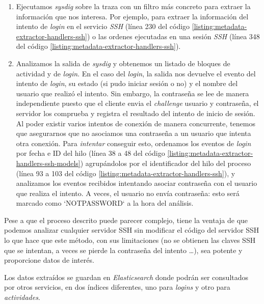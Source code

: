 \begin{enumerate}
    \item Ejecutamos \emph{sysdig} sobre la traza con un filtro más concreto para extraer la información que nos interesa. Por ejemplo, para extraer la información
    del intento de \emph{login} en el servicio \emph{SSH} (línea 230 del código \ref{listing:metadata-extractor-handlers-ssh}) o las ordenes ejecutadas en una sesión \emph{SSH} (línea 348 del código \ref{listing:metadata-extractor-handlers-ssh}).
    \item Analizamos la salida de \emph{sysdig} y obtenemos un listado de bloques de actividad y de \emph{login}. En el caso del \emph{login}, la salida nos devuelve
    el evento del intento de \emph{login}, su estado (si pudo iniciar sesión o no) y el nombre del usuario que realizó el intento. Sin embargo, la contraseña se lee de manera independiente puesto que el cliente 
    envia el \emph{challenge} usuario y contraseña, el servidor los comprueba y registra el resultado del intento de inicio de sesión. Al poder existir varios intentos de conexión de manera concurrente,
    tenemos que asegurarnos que no asociamos una contraseña a un usuario que intenta otra conexión. Para \emph{intentar} conseguir esto, ordenamos los eventos de \emph{login} por fecha e ID del hilo (línea 38 a 48 del código \ref{listing:metadata-extractor-handlers-ssh-models}) agrupándolos por el identificador del hilo del proceso (línea 93 a 103 del código \ref{listing:metadata-extractor-handlers-ssh}), 
    y analizamos los eventos recibidos intentando asociar contraseña con el usuario que realiza el intento. A veces, el usuario no envía contraseña: esto será marcado como `NOTPASSWORD` a la hora del análisis.
\end{enumerate}

Pese a que el proceso descrito puede parecer complejo, tiene la ventaja de que podemos analizar cualquier servidor SSH sin modificar el código del servidor SSH
lo que hace que este método, con sus limitaciones (no se obtienen las claves SSH que se intentan, a veces se pierde la contraseña del intento \ldots), sea potente y proporcione datos de interés.

Los datos extraídos se guardan en \emph{Elasticsearch} donde podrán ser consultados por otros servicios, en dos índices diferentes, uno para \emph{logins}
y otro para \emph{actividades}.

